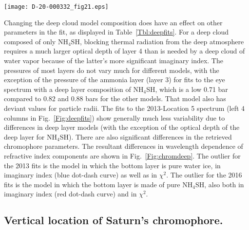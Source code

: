 \documentclass[article,11pt]{emulateapj}
\def\chisqx{$\chi^2$}
\def\nhfshx{NH$_4$SH}
\begin{document}
\begin{figure*}[!ht]\centering
\hspace{-0.15in}\texttt{[image: D-20-000332\_fig21.eps]}
\caption{Chromophore spectral model fits from Table 4 for four different assumed deep cloud compositions.}\label{Fig:chromdeep} 
\end{figure*}

Changing the deep cloud model composition does have an effect on other parameters in the fit, as displayed in
Table\ \ref{Tbl:deepfits}.  For a deep cloud composed of only \nhfshx, blocking thermal radiation from
the deep atmosphere requires a much larger optical depth of layer 4 than is needed by a deep cloud of
water vapor because of the latter's more significant imaginary index.  The pressures of most
layers do not vary much for different models, with the exception of the pressure of the ammonia
layer (layer 3) for fits to the eye spectrum with a deep layer composition of \nhfshx, which is
a low 0.71 bar compared to 0.82 and 0.88 bars for the other models. That model also has 
deviant values for particle radii.   The fits to the 2013-Location 5 spectrum (left 4 columns in Fig.\ \ref{Fig:deepfits})
show generally much less variability due to differences in deep layer models (with the exception
of the optical depth of the deep layer for \nhfshx). There are also significant differences
in the retrieved chromophore parameters. The resultant differences in wavelength dependence
of refractive index components are shown in Fig.\ \ref{Fig:chromdeep}. The outlier for the 2013 fits
is the model in which the bottom layer is pure water ice, in imaginary index (blue dot-dash curve)
as well as in \chisqx.  The outlier for the 2016 fits is the model in which the bottom layer is made of
pure \nhfshx, also both in imaginary index (red dot-dash curve) and in \chisqx.







\subsection{Vertical location of Saturn's chromophore.}\label{Sec:vertloc}
\end{document}
